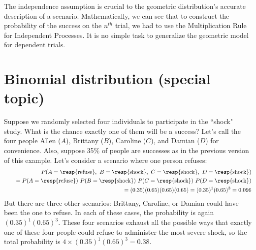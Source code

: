 The independence assumption is crucial to the geometric distribution's accurate description of a scenario. Mathematically, we can see that to construct the probability of the success on the $n^{th}$ trial, we had to use the Multiplication Rule for Independent Processes. It is no simple task to generalize the geometric model for dependent trials.




\section{Binomial distribution (special topic)}
\label{binomialModel}


\begin{example}{Suppose we randomly selected four individuals to participate in the ``shock" study. What is the chance exactly one of them will be a success?  Let's call the four people Allen ($A$), Brittany ($B$), Caroline ($C$), and Damian ($D$) for convenience. Also, suppose 35\% of people are successes as in the previous version of this example.}\label{oneRefuser}
Let's consider a scenario where one person refuses:
\begin{eqnarray*}
&&P(A=\text{\resp{refuse}},\text{ }B=\text{\resp{shock}},\text{ }C=\text{\resp{shock}},\text{ }D=\text{\resp{shock}}) \\
 &&\quad =  P(A=\text{\resp{refuse}})\ P(B=\text{\resp{shock}})\ P(C=\text{\resp{shock}})\ P(D=\text{\resp{shock}}) \\
 &&\quad =  (0.35)  (0.65)  (0.65)  (0.65) = (0.35)^1 (0.65)^3 = 0.096
\end{eqnarray*}
But there are three other scenarios: Brittany, Caroline, or Damian could have been the one to refuse. In each of these cases, the probability is again $(0.35)^1(0.65)^3$. These four scenarios exhaust all the possible ways that exactly one of these four people could refuse to administer the most severe shock, so the total probability is $4\times(0.35)^1(0.65)^3 = 0.38$.
\end{example}

